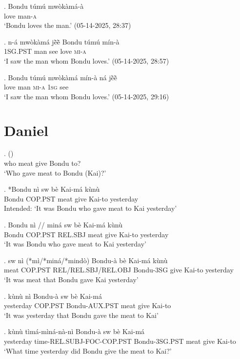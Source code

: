 \documentclass{assets/fieldnotes}
\begin{document}
\exg. Bondu túmú mwòkàmá-à\\
{} love man-\textsc{a}\\
`Bondu loves the man.’ \hfill{(05-14-2025, 28:37)}

\exg. n-á mwòkàmá jẽ̀ẽ̀ Bondu túmú mín-à\\
\textsc{1SG.PST} man see {} love \textsc{mi}-\textsc{a}\\
`I saw the man whom Bondu loves.’ \hfill{(05-14-2025, 28:57)}

\exg. Bondu túmú mwòkàmá mín-à ná jẽ̀ẽ̀\\ 
{} love man \textsc{mi}-\textsc{a} \textsc{1sg} see\\
`I saw the man whom Bondu loves.’ \hfill{(05-14-2025, 29:16)}

\section{Daniel}
\exg.     () \\
who meat give Bondu {} to?\\
`Who gave meat to Bondu (Kai)?'

\exg. *Bondu nì sw bè Kai-má kùnù\\
Bondu COP.PST meat give Kai-to yesterday\\
Intended: `It was Bondu who gave meat to Kai yesterday'

\exg. Bondu nì // miná sw bè Kai-má kùnù\\
Bondu COP.PST {} REL.SBJ meat give Kai-to yesterday\\
`It was Bondu who gave meat to Kai yesterday'

\exg. sw nì (*mì/*miná/*mindò) Bondu-à bè Kai-má kùnù\\
meat COP.PST REL/REL.SBJ/REL.OBJ Bondu-3SG give Kai-to yesterday\\
`It was meat that Bondu gave Kai yesterday'

\exg. kùnù nì Bondu-à sw bè Kai-má\\
yesterday COP.PST Bondu-AUX.PST meat give Kai-to\\
`It was yesterday that Bondu gave the meat to Kai'

\exg. kùnù tìmá-mìná-nà-nì Bondu-à sw bè Kai-má\\
yesterday time-REL.SUBJ-FOC-COP.PST Bondu-3SG.PST meat give Kai-to\\
`What time yesterday did Bondu give the meat to Kai?'
\end{document}
